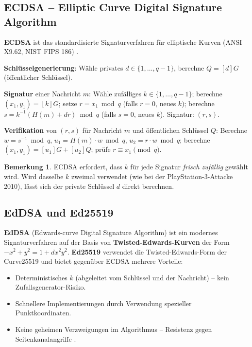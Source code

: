 ﻿\documentclass[a4paper,12pt]{scrreprt}
\theoremstyle{definition}
\newtheorem{bemerkung}{Bemerkung}[section]
\begin{document}
\subsection{ECDSA -- Elliptic Curve Digital Signature Algorithm}

\textbf{ECDSA} ist das standardisierte Signaturverfahren für elliptische Kurven (ANSI X9.62, NIST FIPS 186) \cite{GMR88}.

\textbf{Schlüsselgenerierung}: Wähle privates $d \in \{1,\ldots,q-1\}$, berechne $Q = [d]G$ (öffentlicher Schlüssel).

\textbf{Signatur} einer Nachricht $m$: Wähle zufälliges $k \in \{1,\ldots,q-1\}$; berechne $(x_1, y_1) = [k]G$; setze $r = x_1 \bmod q$ (falls $r=0$, neues $k$); berechne $s = k^{-1}(H(m) + dr) \bmod q$ (falls $s=0$, neues $k$). Signatur: $(r, s)$.

\textbf{Verifikation} von $(r,s)$ für Nachricht $m$ und öffentlichen Schlüssel $Q$: Berechne $w = s^{-1} \bmod q$, $u_1 = H(m)\cdot w \bmod q$, $u_2 = r\cdot w \bmod q$; berechne $(x_1,y_1) = [u_1]G + [u_2]Q$; prüfe $r \equiv x_1 \pmod{q}$.

\begin{bemerkung}
ECDSA erfordert, dass $k$ für jede Signatur \emph{frisch zufällig} gewählt wird. Wird dasselbe $k$ zweimal verwendet (wie bei der PlayStation-3-Attacke 2010), lässt sich der private Schlüssel $d$ direkt berechnen.
\end{bemerkung}

\subsection{EdDSA und Ed25519}

\textbf{EdDSA} (Edwards-curve Digital Signature Algorithm) \cite{BLC+11} ist ein modernes Signaturverfahren auf der Basis von \textbf{Twisted-Edwards-Kurven} der Form $-x^2 + y^2 = 1 + dx^2y^2$. \textbf{Ed25519} verwendet die Twisted-Edwards-Form der Curve25519 und bietet gegenüber ECDSA mehrere Vorteile:
\begin{itemize}
    \item Deterministisches $k$ (abgeleitet vom Schlüssel und der Nachricht) -- kein Zufallsgenera\-tor-Risiko.
    \item Schnellere Implementierungen durch Verwendung spezieller Punktkoordinaten.
    \item Keine geheimen Verzweigungen im Algorithmus -- Resistenz gegen Seitenkanalangriffe \cite{Koc96}.
\end{itemize}
\end{document}

